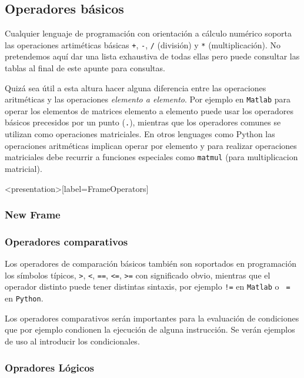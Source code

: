 \subsection{Operadores básicos}

Cualquier lenguaje de programación con orientación a cálculo numérico soporta 
las operaciones artiméticas básicas \texttt{+}, \texttt{-}, \texttt{/} (división) 
y \texttt{*} (multiplicación).
No pretendemos aquí dar una lista exhaustiva
de todas ellas pero puede consultar las tablas al final 
de este apunte para consultas.

Quizá sea útil a esta altura hacer alguna diferencia entre las operaciones 
aritméticas y las operaciones \emph{elemento a elemento}. Por ejemplo en \texttt{Matlab}
para operar los elementos de matrices elemento a elemento puede usar los operadores 
básicos precesidos por un punto (\texttt{.}), mientras que los operadores 
comunes se utilizan como operaciones matriciales. En otros lenguages como Python 
las operaciones aritméticas implican operar por elemento y para realizar operaciones 
matriciales debe recurrir a funciones especiales como \texttt{matmul} (para 
multiplicacion matricial).

\begin{figure}

\end{figure}

\mode*
\begin{frame}<presentation>[label=FrameOperators]
  \frametitle{New Frame}

\end{frame}


\subsubsection{Operadores comparativos}

Los operadores de comparación básicos también son soportados en 
programación los símbolos típicos, \texttt{>}, \texttt{<}, \texttt{==},
\texttt{<=}, \texttt{>=} con significado obvio, mientras que el 
operador distinto puede tener distintas sintaxis, por ejemplo \texttt{!=}
en \texttt{Matlab} o \texttt{~=} en \texttt{Python}. 

Los operadores comparativos serán importantes para la evaluación 
de condiciones que por ejemplo condionen la ejecución de alguna instrucción.
Se verán ejemplos de uso al introducir los condicionales.

\subsubsection{Opradores Lógicos}

